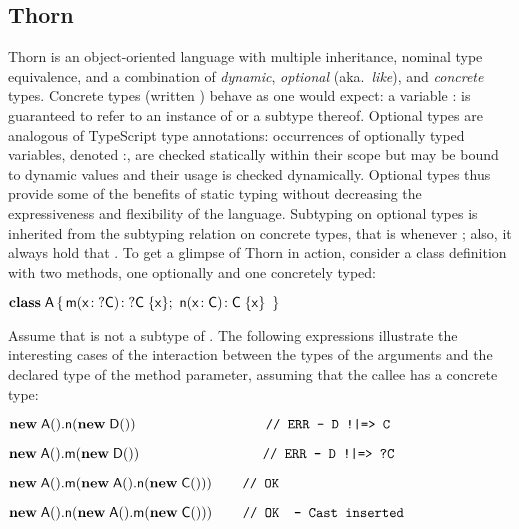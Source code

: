 \documentclass[acmlarge, anonymous, authordraft, review]{acmart} %
\begin{document}

\subsection{Thorn}

Thorn is an object-oriented language with multiple inheritance,
nominal type equivalence, and a combination of \emph{dynamic}, \emph{optional} (aka.~\emph{like}), and \emph{concrete} types.  Concrete types (written \C) behave as one would expect: a variable {\x:\C} is
guaranteed to refer to an instance of \C or a subtype thereof.  Optional types are analogous of TypeScript type annotations: occurrences of optionally typed variables, denoted {\x:\dt\C}, are checked statically within their scope but may be bound to dynamic values and their usage is checked dynamically.  Optional types thus provide some of the benefits of static typing without decreasing the expressiveness and flexibility of the language.  Subtyping on optional types is inherited from the subtyping relation on concrete types, that is {\dt\C} \Sub {\dt\D} whenever \C \Sub \D; also, it always hold that \C \Sub  \dt\C. To get a glimpse of Thorn in action, consider a class definition with two methods, one optionally and one concretely typed:

\medskip
\(
 \Class \A {
    \Mdef \m\x{\dt\C} {\dt\C}  \x  ; \ 
    \Mdef \n\x\C\C  \x 
    }
\)
\medskip

\noindent Assume that \D is not a subtype of \C.  The following expressions illustrate the interesting cases of the interaction between the types of the arguments and the declared type of the method parameter, assuming that the callee has a concrete type:

\medskip
\( \Call {\New \A{}}\n {\New \D{} } \ \ \ \ \ \ \ \ \ \ \ \ \ \ \ \ \ \ \ \ \ \ \ \ \ \ \ \ \texttt{// ERR -- D !|=> C} \)

\( \Call {\New \A{}}\m {\New \D{}} \ \ \ \ \ \ \ \ \ \ \ \ \ \ \ \ \ \ \ \ \ \ \ \ \ \texttt{ // ERR -- D !|=> ?C }\)

\( \Call {\New \A{}} \m { \Call {\New \A {}} \n {\New \C{}} } \ \ \ \ \ \texttt{ // OK }\)

\( \Call {\New \A{}} \n { \Call {\New \A{}} \m {\New \C{}}} \ \ \ \ \ \texttt{ // OK \   -- Cast inserted} \)

\medskip
\end{document}
